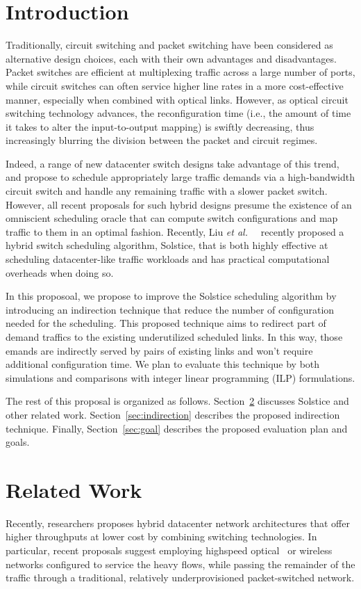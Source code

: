 \section{Introduction}

Traditionally, circuit switching and packet switching have been
considered as alternative design choices, each with their own advantages
and disadvantages. Packet switches are efficient at multiplexing traffic
across a large number of ports, while circuit switches can often service
higher line rates in a more cost-effective manner, especially when
combined with optical links. However, as optical circuit switching
technology advances, the reconfiguration time (i.e., the amount of time
it takes to alter the input-to-output mapping) is swiftly decreasing,
thus increasingly blurring the division between the packet and circuit
regimes.

Indeed, a range of new datacenter switch designs take advantage of this
trend, and propose to schedule appropriately large traffic demands via a
high-bandwidth circuit switch and handle any remaining traffic with a
slower packet switch. However, all recent proposals for such hybrid
designs presume the existence of an omniscient scheduling oracle that
can compute switch configurations and map traffic to them in an optimal
fashion. Recently, Liu \textit{et al.\ }~\cite{Liu:2015} recently
proposed a hybrid switch scheduling algorithm, Solstice, that is both
highly effective at scheduling datacenter-like traffic workloads and has
practical computational overheads when doing so.

In this proposoal, we propose to improve the Solstice scheduling
algorithm by introducing an indirection technique that reduce the number
of configuration needed for the scheduling. This proposed technique aims
to redirect part of demand traffics to the existing underutilized
scheduled links. In this way, those emands are indirectly served by
pairs of existing links and won't require additional configuration time.
We plan to evaluate this technique by both simulations and comparisons
with integer linear programming (ILP) formulations.

The rest of this proposal is organized as follows.
Section~\ref{sec:related} discusses Solstice and other related work.
Section~\ref{sec:indirection} describes the proposed indirection
technique. Finally, Section~\ref{sec:goal} describes the proposed evaluation plan
and goals.

\section{Related Work}
\label{sec:related}
Recently, researchers proposes hybrid datacenter network architectures
that offer higher throughputs at lower cost by combining switching
technologies. In particular, recent proposals suggest employing
highspeed optical~\cite{Chen:2012, Farrington:2010, Wang:2010} or
wireless~\cite{Halperin:2011, Kandula:2009, Zhou:2012} networks
configured to service the heavy flows, while passing the remainder of
the traffic through a traditional, relatively underprovisioned
packet-switched network. 

